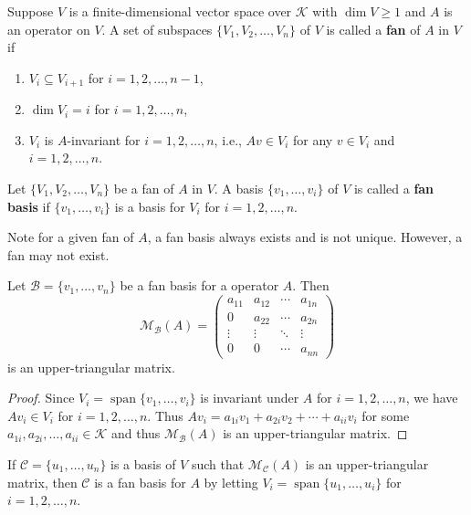 \documentclass{ctexart}
\begin{document}
    \begin{mydef}
        Suppose $V$ is a finite-dimensional vector space over $\mathcal K$ with $\dim V\ge 1$ and $A$ is an operator on $V$. A set of subspaces $\{ V_1, V_2, \ldots, V_n \}$ of $V$ is called a \textbf{fan} of $A$ in $V$ if
        \begin{enumerate}[label=(\arabic*)]
            \item $V_i \subseteq V_{i+1}$ for $i=1,2,\ldots,n-1$,
            \item $\dim V_i = i$ for $i=1,2,\ldots,n$,
            \item $V_i$ is $A$-invariant for $i=1,2,\ldots,n$, i.e., $A v \in V_i$ for any $v\in V_i$ and $i=1,2,\ldots,n$.
        \end{enumerate}
        Let $\{ V_1, V_2, \ldots, V_n \}$ be a fan of $A$ in $V$. A basis $\{ v_1, \ldots, v_i \}$ of $V$ is called a \textbf{fan basis} if $\{ v_1, \ldots, v_i \}$ is a basis for $V_i$ for $i=1,2,\ldots,n$.
    \end{mydef}
    \begin{myrmk}
        Note for a given fan of $A$, a fan basis always exists and is not unique. However, a fan may not exist.
    \end{myrmk}
    \begin{mythm}
        Let $\mathcal{B} = \{v_1, \ldots, v_n\}$ be a fan basis for a operator $A$. Then $$\mathcal{M}_\mathcal{B} (A) = \begin{pmatrix}
            a_{11} & a_{12} & \cdots & a_{1n} \\
            0 & a_{22} & \cdots & a_{2n} \\
            \vdots & \vdots & \ddots & \vdots \\
            0 & 0 & \cdots & a_{nn}
        \end{pmatrix}$$ is an upper-triangular matrix.
    \end{mythm}
    \begin{proof}
        Since $V_i = \operatorname{span}\{ v_1, \ldots, v_i \}$ is invariant under $A$ for $i=1,2,\ldots,n$, we have $A v_i \in V_i$ for $i=1,2,\ldots,n$. Thus $A v_i = a_{1i} v_1 + a_{2i} v_2 + \cdots + a_{ii} v_i$ for some $a_{1i}, a_{2i}, \ldots, a_{ii} \in \mathcal K$ and thus $\mathcal{M}_\mathcal{B}(A)$ is an upper-triangular matrix.
    \end{proof}
    \begin{myrmk}
        If $\mathcal C = \{ u_1, \ldots, u_n \}$ is a basis of $V$ such that $\mathcal M_\mathcal{C}(A)$ is an upper-triangular matrix, then $\mathcal C$ is a fan basis for $A$ by letting $V_i = \operatorname{span} \{ u_1, \ldots, u_i \}$ for $i=1,2,\ldots,n$.
    \end{myrmk}
\end{document}
